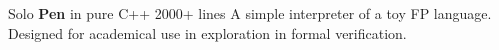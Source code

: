 \documentclass[10pt]{article} %
\begin{document}
\begin{paracol}{2}
{Solo}
{\textbf{Pen} in pure C++}
{2000+ lines}
{A simple interpreter of a toy FP language. Designed for academical use in exploration in formal verification.}










\end{paracol}

\end{document}
